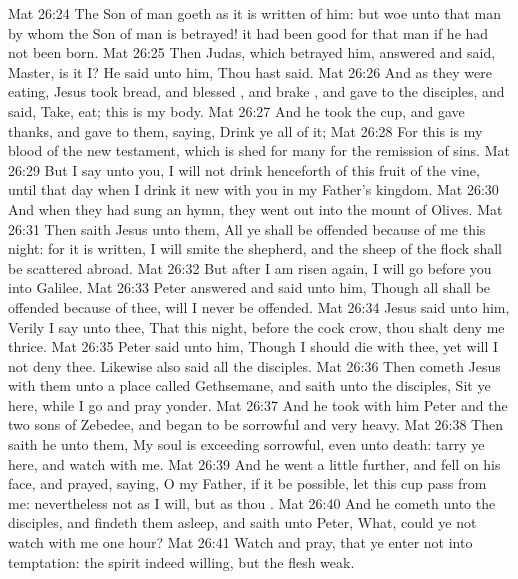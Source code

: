\vs Mat 26:24 The Son of man goeth as it is written of him: but woe unto that man by whom the Son of man is betrayed! it had been good for that man if he had not been born.
\vs Mat 26:25 Then Judas, which betrayed him, answered and said, Master, is it I? He said unto him, Thou hast said.
\vs Mat 26:26 And as they were eating, Jesus took bread, and blessed , and brake , and gave  to the disciples, and said, Take, eat; this is my body.
\vs Mat 26:27 And he took the cup, and gave thanks, and gave  to them, saying, Drink ye all of it;
\vs Mat 26:28 For this is my blood of the new testament, which is shed for many for the remission of sins.
\vs Mat 26:29 But I say unto you, I will not drink henceforth of this fruit of the vine, until that day when I drink it new with you in my Father's kingdom.
\vs Mat 26:30 And when they had sung an hymn, they went out into the mount of Olives.
\vs Mat 26:31 Then saith Jesus unto them, All ye shall be offended because of me this night: for it is written, I will smite the shepherd, and the sheep of the flock shall be scattered abroad.
\vs Mat 26:32 But after I am risen again, I will go before you into Galilee.
\vs Mat 26:33 Peter answered and said unto him, Though all  shall be offended because of thee,  will I never be offended.
\vs Mat 26:34 Jesus said unto him, Verily I say unto thee, That this night, before the cock crow, thou shalt deny me thrice.
\vs Mat 26:35 Peter said unto him, Though I should die with thee, yet will I not deny thee. Likewise also said all the disciples.
\vs Mat 26:36 Then cometh Jesus with them unto a place called Gethsemane, and saith unto the disciples, Sit ye here, while I go and pray yonder.
\vs Mat 26:37 And he took with him Peter and the two sons of Zebedee, and began to be sorrowful and very heavy.
\vs Mat 26:38 Then saith he unto them, My soul is exceeding sorrowful, even unto death: tarry ye here, and watch with me.
\vs Mat 26:39 And he went a little further, and fell on his face, and prayed, saying, O my Father, if it be possible, let this cup pass from me: nevertheless not as I will, but as thou .
\vs Mat 26:40 And he cometh unto the disciples, and findeth them asleep, and saith unto Peter, What, could ye not watch with me one hour?
\vs Mat 26:41 Watch and pray, that ye enter not into temptation: the spirit indeed  willing, but the flesh  weak.
